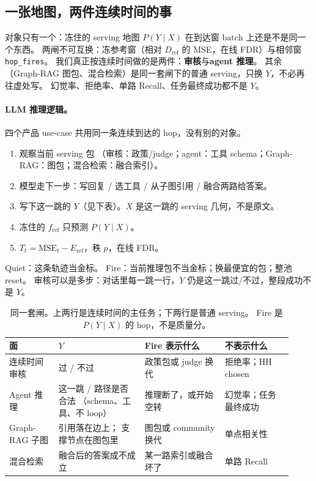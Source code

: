 \subsection{一张地图，两件连续时间的事}
\label{sec:online-serving-gates-zh}
对象只有一个：冻住的 serving 地图 \(P(Y\mid X)\) 在到达窗 \(\mathrm{batch}\) 上还是不是同一个东西。
两闸不可互换：冻参考窗（相对 \(D_{\mathrm{ref}}\) 的 MSE，在线 FDR）与相邻窗 \texttt{hop\_fires}。
我们真正按连续时间做的是两件：\textbf{审核}与\textbf{agent 推理}。
其余（Graph-RAG 图包、混合检索）是同一套闸下的普通 serving，只换 \(Y\)，不必再往虚处写。
幻觉率、拒绝率、单路 Recall、任务最终成功都不是 \(Y\)。

\paragraph{LLM 推理逻辑。}
四个产品 use-case 共用同一条连续到达的 hop，没有别的对象。
\begin{enumerate}\itemsep=2pt
\item 观察当前 serving 包
      （审核：政策/judge；agent：工具 schema；Graph-RAG：图包；混合检索：融合索引）。
\item 模型走下一步：写回复 / 选工具 / 从子图引用 / 融合两路给答案。
\item 写下这一跳的 \(Y\)（见下表）。\(X\) 是这一跳的 serving 几何，不是原文。
\item 冻住的 \(f_{\mathrm{ref}}\) 只预测 \(P(Y\mid X)\)。
\item \(T_t=\mathrm{MSE}_t-E_{\mathrm{ref}}\)，秩 \(p\)，在线 FDR。
\end{enumerate}
Quiet：这条轨迹当金标。
Fire：当前推理包不当金标；换最便宜的包；整池 reset。
审核可以是多步：对话里每一跳一行，\(Y\) 仍是这一跳过/不过，整段成功不是 \(Y\)。

\begin{table}[t]
\centering
\caption{同一套闸。上两行是连续时间的主任务；下两行是普通 serving。
Fire 是 \(P(Y\mid X)\) 的 hop，不是质量分。}
\label{tab:serving-facets-zh}
\setlength{\tabcolsep}{3.5pt}
\small
\begin{tabular}{@{}>{\raggedright\arraybackslash}p{0.16\linewidth}
                >{\raggedright\arraybackslash}p{0.28\linewidth}
                >{\raggedright\arraybackslash}p{0.26\linewidth}
                >{\raggedright\arraybackslash}p{0.22\linewidth}@{}}
\toprule
面 & \(Y\) & Fire 表示什么 & 不表示什么 \\
\midrule
连续时间审核
  & 过 / 不过
  & 政策包或 judge 换代
  & 拒绝率；HH chosen \\
Agent 推理
  & 这一跳 / 路径是否合法
    （schema、工具、不 loop）
  & 推理断了，或开始空转
  & 幻觉率；任务最终成功 \\
\midrule
Graph-RAG 子图
  & 引用落在边上；
    支撑节点在图包里
  & 图包或 community 换代
  & 单点相关性 \\
混合检索
  & 融合后的答案成不成立
  & 某一路索引或融合坏了
  & 单路 Recall \\
\bottomrule
\end{tabular}
\end{table}

